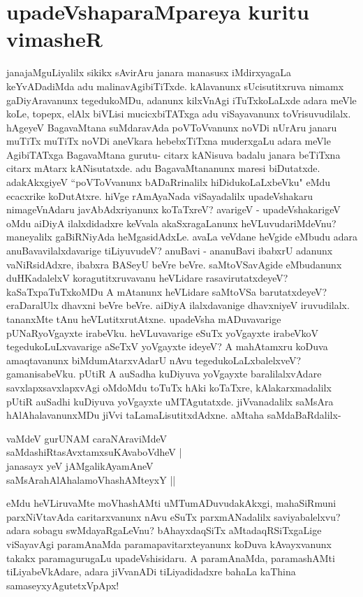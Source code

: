\section*{upadeVshaparaMpareya kuritu vimasheR} 


janajaMguLiyalilx sikikx sAvirAru janara manasusx iMdirxyagaLa keYvADadiMda adu malinavAgibiTiTxde. kAlavanunx sUcisutitxruva nimamx gaDiyAravanunx tegedukoMDu, adanunx kilxVnAgi iTuTxkoLaLxde adara meVle koLe, topepx, elAlx biVLisi mucicxbiTATxga adu viSayavanunx toVrisuvudilalx. hAgeyeV BagavaMtana suMdaravAda poVToVvanunx noVDi nUrAru janaru muTiTx muTiTx noVDi aneVkara hebebxTiTxna muderxgaLu adara meVle AgibiTATxga BagavaMtana gurutu- citarx kANisuva badalu janara beTiTxna citarx mAtarx kANisutatxde. adu BagavaMtananunx maresi biDutatxde. adakAkxgiyeV ``poVToVvanunx bADaRrinalilx hiDidukoLaLxbeVku" eMdu ecacxrike koDutAtxre. hiVge rAmAyaNada viSayadalilx upadeVshakaru nimageVnAdaru javAbAdxriyanunx koTaTxreV? avarigeV - upadeVshakarigeV oMdu aiDiyA ilalxdidadxre keVvala akaSxragaLanunx heVLuvudariMdeVnu? maneyalilx gaBiRNiyAda heMgasidAdxLe. avaLa veVdane heVgide eMbudu adara anuBavavilalxdavarige tiLiyuvudeV? anuBavi - ananuBavi ibabxrU adanunx vaNiRsidAdxre, ibabxra BASeyU beVre beVre. saMtoVSavAgide eMbudanunx duHKadalelxV koragutitxruvavanu heVLidare rasavirutatxdeyeV? kaSaTxpaTuTxkoMDu A mAtanunx heVLidare saMtoVSa barutatxdeyeV? eraDaralUlx dhavxni beVre beVre. aiDiyA ilalxdavanige dhavxniyeV iruvudilalx. tananxMte tAnu heVLutitxrutAtxne. upadeVsha mADuvavarige pUNaRyoVgayxte irabeVku. heVLuvavarige eSuTx yoVgayxte irabeVkoV tegedukoLuLxvavarige aSeTxV yoVgayxte ideyeV? A mahAtamxru koDuva amaqtavanunx biMdumAtarxvAdarU nAvu tegedukoLaLxbalelxveV? gamanisabeVku. pUtiR A auSadha kuDiyuva yoVgayxte baralilalxvAdare savxlapxsavxlapxvAgi oMdoMdu toTuTx hAki koTaTxre, kAlakarxmadalilx pUtiR auSadhi kuDiyuva yoVgayxte uMTAgutatxde. jiVvanadalilx saMsAra hAlAhalavanunxMDu jiVvi taLamaLisutitxdAdxne. aMtaha saMdaBaRdalilx- 


\begin{shloka}
vaMdeV gurUNAM caraNAraviMdeV\label{180a}\\ 
saMdashiRtasAvxtamxsuKAvaboVdheV |\\ 
janasayx yeV jAMgalikAyamAneV\\ 
saMsArahAlAhalamoVhashAMteyxY ||
\end{shloka} 


eMdu heVLiruvaMte moVhashAMti uMTumADuvudakAkxgi, mahaSiRmuni parxNiVtavAda caritarxvanunx nAvu eSuTx parxmANadalilx saviyabalelxvu? adara sobagu swMdayaRgaLeVnu? bAhayxdaqSiTx aMtadaqRSiTxgaLige viSayavAgi paramAnaMda paramapavitarxteyanunx koDuva kAvayxvanunx takakx paramagurugaLu upadeVshisidaru. A paramAnaMda, paramashAMti tiLiyabeVkAdare, adara jiVvanADi tiLiyadidadxre bahaLa kaThina samaseyxyAgutetxVpApx! 


